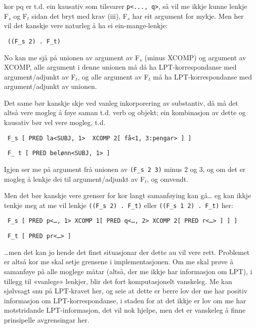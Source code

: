 \documentclass[11pt,a4paper,oneside,draft]{book}
\begin{document}
kor pq er t.d. ein kausativ som tilsvarer \texttt{p<..., q>}, så vil me ikkje
kunne lenkje F$_s$ og F$_t$ sidan det bryt med krav (iii), F$_s$ har eit
argument for mykje. Men her vil det kanskje vere naturleg å ha ei
ein-mange-lenkje:

\begin{verbatim}
 ((F_s 2) . F_t)
\end{verbatim}


No kan me sjå på unionen av argument av F$_s$ (minus XCOMP) og argument
av XCOMP, alle argument i denne unionen må då ha LPT-korrespondanse
med argument/adjunkt av F$_t$, og alle argument av F$_t$ må ha
LPT-korrespondanse med argument/adjunkt av unionen.

Det same bør kanskje skje ved vanleg inkorporering av substantiv, då
må det altså vere mogleg å føye saman t.d. verb og objekt; ein
kombinasjon av dette og kausativ bør vel vere mogleg, t.d.

\begin{verbatim}
 F_s [ PRED la<SUBJ, 1>  XCOMP 2[ få<1, 3:pengar> ] ]
\end{verbatim}


\begin{verbatim}
 F_ t [ PRED belønn<SUBJ, 1> ]
\end{verbatim}


Igjen ser me på argument frå unionen av \texttt{(F\_s 2 3)} minus 2 og 3, og
om det er mogleg å lenkje dei til argument/adjunkt av F$_t$, og omvendt.

Men det bør kanskje vere grenser for kor langt samanføying kan gå… eg
kan ikkje tenkje meg at me vil lenkje \texttt{((F\_s 2) . F\_t)} eller \texttt{((F\_s 1 2) . F\_t)} her:

\begin{verbatim}
 F_s [ PRED p<…, 1> XCOMP 1[ PRED q<…, 2> XCOMP 2[ PRED r<…> ] ] ]
\end{verbatim}


\begin{verbatim}
 F_t [ PRED pr<…> ]
\end{verbatim}


\ldots{}men det kan jo hende det finst situasjonar der dette au vil vere
rett. Problemet er altså kor me skal setje grensene i
implementasjonen. Om me skal prøve å samanføye på alle moglege måtar
(altså, der me ikkje har informasjon om LPT), i tillegg til «vanlege»
lenkjer, blir det fort komputasjonelt vanskeleg. Me kan sjølvsagt snu
på LPT-kravet her, og seie at dette er berre lov der me har positiv
informasjon om LPT-korrespondanse, i staden for at det ikkje er lov om
me har motstridande LPT-informasjon, det vil nok hjelpe, men det er
vanskeleg å finne prinsipelle avgrensingar her. 
\end{document}

